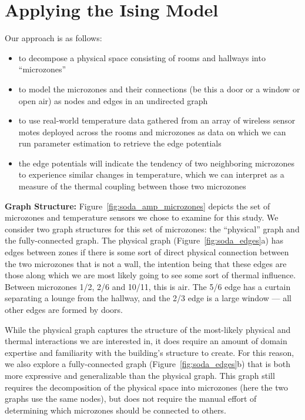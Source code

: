 \section{Applying the Ising Model}



Our approach is as follows:

\begin{itemize}[noitemsep, nolistsep]
\item to decompose a physical space consisting of rooms and hallways into ``microzones''
\item to model the microzones and their connections (be this a door or a window or open air) as nodes and edges in an undirected graph
\item to use real-world temperature data gathered from an array of wireless sensor motes deployed across the rooms and microzones as data on which we can run parameter estimation to retrieve the edge potentials
\item the edge potentials will indicate the tendency of two neighboring microzones to experience similar changes in temperature, which we can interpret as a measure of the thermal coupling between those two microzones
\end{itemize}

\textbf{Graph Structure:} Figure~\ref{fig:soda_amp_microzones} depicts the set of microzones and temperature sensors we chose to examine for this study.
We consider two graph structures for this set of microzones: the ``physical'' graph and the fully-connected graph.
The physical graph (Figure~\ref{fig:soda_edges}a) has edges between zones if there is some sort of direct physical connection between the two microzones that is not a wall, the intention being that these edges are those along which we are most likely going to see some sort of thermal influence.
Between microzones 1/2, 2/6 and 10/11, this is air.
The 5/6 edge has a curtain separating a lounge from the hallway, and the 2/3 edge is a large window --- all other edges are formed by doors.

While the physical graph captures the structure of the most-likely physical and thermal interactions we are interested in, it does require an amount of domain expertise and familiarity with the building's structure to create.
For this reason, we also explore a fully-connected graph (Figure~\ref{fig:soda_edges}b) that is both more expressive and generalizable than the physical graph.
This graph still requires the decomposition of the physical space into microzones (here the two graphs use the same nodes), but does not require the manual effort of determining which microzones should be connected to others.


